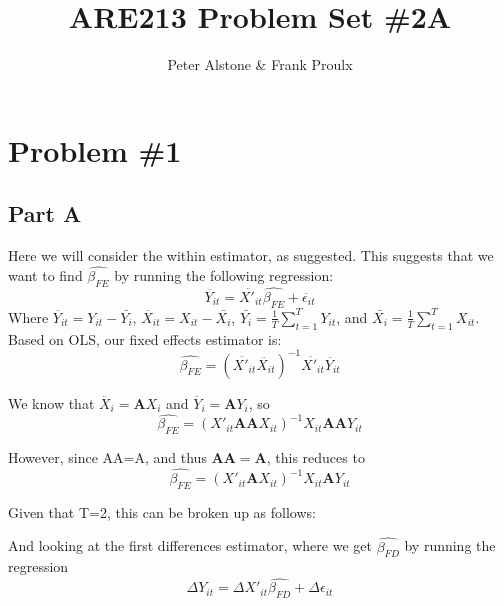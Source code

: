 \documentclass[letterpaper, 12pt]{article}
\begin{document}
\title{ARE213 Problem Set \#2A}
\author{Peter Alstone \& Frank Proulx}
\maketitle

\section{Problem \#1}
\subsection{Part A}
Here we will consider the within estimator, as suggested. This suggests that we want to find $\widehat{\beta_{FE}}$ by running the following regression:
\begin{equation}
\ddot{Y_{it}} = \ddot{X'_{it}}\widehat{\beta_{FE}} + \ddot{\epsilon_{it}}
\end{equation}
Where $\ddot{Y_{it}}=Y_{it}-\bar{Y_i}$, $\ddot{X_{it}}=X_{it}-\bar{X_i}$, $\bar{Y_i}=\frac{1}{T}\sum_{t=1}^TY_{it}$, and $\bar{X_i}=\frac{1}{T}\sum_{t=1}^TX_{it}$.
Based on OLS, our fixed effects estimator is:
\begin{equation}
\widehat{\beta_{FE}}=(\ddot{X'_{it}}\ddot{X_{it}})^{-1}\ddot{X'_{it}}\ddot{Y_{it}} %
\end{equation}

We know that $\ddot{X_{i}}=\boldsymbol{A}X_i$ and $\ddot{Y_{i}}=\boldsymbol{A}Y_{i}$, so
\begin{equation}
\widehat{\beta_{FE}} = (X'_{it}\boldsymbol{A}\boldsymbol{A}X_{it})^{-1} X_{it}\boldsymbol{A}\boldsymbol{A}Y_{it}
\end{equation}

However, since AA=A, and thus $\boldsymbol{AA}=\boldsymbol{A}$, this reduces to
\begin{equation}
\widehat{\beta_{FE}} = (X'_{it}\boldsymbol{A}X_{it})^{-1} X_{it} \boldsymbol{A} Y_{it}
\end{equation}

Given that T=2, this can be broken up as follows:





And looking at the first differences estimator, where we get $\widehat{\beta_{FD}}$ by running the regression
\begin{equation}
\Delta Y_{it} = \Delta X'_{it} \widehat{\beta_{FD}} + \Delta \epsilon_{it}
\end{equation}
\end{document}
